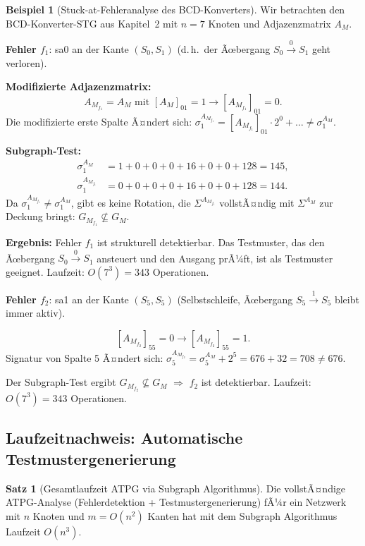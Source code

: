 ﻿\documentclass[a4paper,12pt]{article}
\theoremstyle{definition}
\newtheorem{beispiel}{Beispiel}
\newtheorem{satz}{Satz}
\begin{document}
\begin{beispiel}[Stuck-at-Fehleranalyse des BCD-Konverters]\label{bsp:atpg_bcd}
  Wir betrachten den BCD-Konverter-STG aus Kapitel~2 mit $n = 7$ Knoten und
  Adjazenzmatrix $A_M$.

  \textbf{Fehler $f_1$}: sa0 an der Kante $(S_0, S_1)$ (d.\,h.\ der Ãœbergang
  $S_0 \xrightarrow{0} S_1$ geht verloren).

  \textbf{Modifizierte Adjazenzmatrix:}
  \[
    A_{M_{f_1}} = A_M \text{ mit } [A_M]_{01} = 1 \to [A_{M_{f_1}}]_{01} = 0.
  \]
  Die modifizierte erste Spalte Ã¤ndert sich:
  $\sigma_1^{A_{M_{f_1}}} = [A_{M_{f_1}}]_{01} \cdot 2^0 + \ldots \neq \sigma_1^{A_M}$.

  \textbf{Subgraph-Test:}
  \begin{align*}
    \sigma_1^{A_M} &= 1 + 0 + 0 + 0 + 16 + 0 + 0 + 128 = 145, \\
    \sigma_1^{A_{M_{f_1}}} &= 0 + 0 + 0 + 0 + 16 + 0 + 0 + 128 = 144.
  \end{align*}
  Da $\sigma_1^{A_{M_{f_1}}} \neq \sigma_1^{A_M}$, gibt es keine Rotation, die
  $\Sigma^{A_{M_{f_1}}}$ vollstÃ¤ndig mit $\Sigma^{A_M}$ zur Deckung bringt:
  $G_{M_{f_1}} \not\subseteq G_M$.

  \textbf{Ergebnis:} Fehler $f_1$ ist strukturell detektierbar. Das Testmuster, das
  den Ãœbergang $S_0 \xrightarrow{0} S_1$ ansteuert und den Ausgang prÃ¼ft, ist als
  Testmuster geeignet. Laufzeit: $O(7^3) = 343$ Operationen.

  \textbf{Fehler $f_2$}: sa1 an der Kante $(S_5, S_5)$ (Selbstschleife, Ãœbergang
  $S_5 \xrightarrow{1} S_5$ bleibt immer aktiv).

  \[
    [A_{M_{f_2}}]_{55} = 0 \to [A_{M_{f_2}}]_{55} = 1.
  \]
  Signatur von Spalte 5 Ã¤ndert sich: $\sigma_5^{A_{M_{f_2}}} = \sigma_5^{A_M} + 2^5 = 676 + 32
  = 708 \neq 676$.

  Der Subgraph-Test ergibt $G_{M_{f_2}} \not\subseteq G_M$ $\Rightarrow$ $f_2$ ist
  detektierbar. Laufzeit: $O(7^3) = 343$ Operationen.
\end{beispiel}

\subsection{Laufzeitnachweis: Automatische Testmustergenerierung}

\begin{satz}[Gesamtlaufzeit ATPG via Subgraph Algorithmus]\label{satz:atpglaufzeit}
  Die vollstÃ¤ndige ATPG-Analyse (Fehlerdetektion + Testmustergenerierung) fÃ¼r ein
  Netzwerk mit $n$ Knoten und $m = O(n^2)$ Kanten hat mit dem Subgraph Algorithmus
  Laufzeit $O(n^3)$.
\end{satz}
\end{document}
